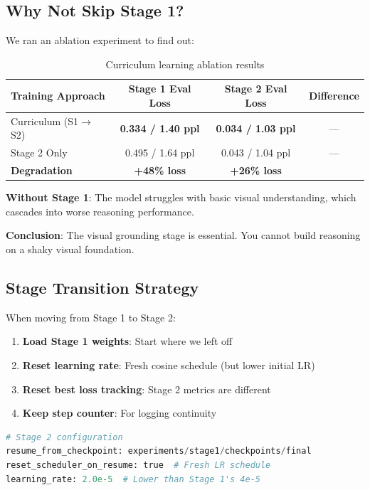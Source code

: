 \documentclass[11pt,a4paper]{article}
\begin{document}
\subsection{Why Not Skip Stage 1?}

We ran an ablation experiment to find out:

\begin{table}[H]
\centering
\begin{tabular}{@{}lccc@{}}
\toprule
\textbf{Training Approach} & \textbf{Stage 1 Eval Loss} & \textbf{Stage 2 Eval Loss} & \textbf{Difference} \\
\midrule
Curriculum (S1$\rightarrow$S2) & \textbf{0.334 / 1.40 ppl} & \textbf{0.034 / 1.03 ppl} & --- \\
Stage 2 Only & 0.495 / 1.64 ppl & 0.043 / 1.04 ppl & --- \\
\midrule
\textbf{Degradation} & \textbf{+48\% loss} & \textbf{+26\% loss} & \\
\bottomrule
\end{tabular}
\caption{Curriculum learning ablation results}
\end{table}

\begin{warningbox}
\textbf{Without Stage 1}: The model struggles with basic visual understanding, which cascades into worse reasoning performance.

\textbf{Conclusion}: The visual grounding stage is essential. You cannot build reasoning on a shaky visual foundation.
\end{warningbox}

\subsection{Stage Transition Strategy}

When moving from Stage 1 to Stage 2:

\begin{enumerate}
    \item \textbf{Load Stage 1 weights}: Start where we left off
    \item \textbf{Reset learning rate}: Fresh cosine schedule (but lower initial LR)
    \item \textbf{Reset best loss tracking}: Stage 2 metrics are different
    \item \textbf{Keep step counter}: For logging continuity
\end{enumerate}

\begin{lstlisting}[language=Python,caption=Stage 2 configuration]
# Stage 2 configuration
resume_from_checkpoint: experiments/stage1/checkpoints/final
reset_scheduler_on_resume: true  # Fresh LR schedule
learning_rate: 2.0e-5  # Lower than Stage 1's 4e-5
\end{lstlisting}
\end{document}
